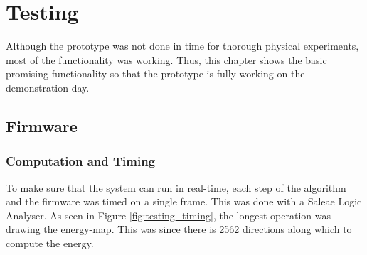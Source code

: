 \documentclass[notitlepage]{report}
\begin{document}
\chapter{Testing}

Although the prototype was not done in time for thorough physical experiments, most of the functionality was working. Thus, this chapter shows the basic promising functionality so that the prototype is fully working on the demonstration-day.

%
%
%

\section{Firmware}

\subsection{Computation and Timing} \label{Computation_and_Timing}

To make sure that the system can run in real-time, each step of the algorithm and the firmware was timed on a single frame. This was done with a Saleae Logic Analyser. As seen in Figure-\ref{fig:testing_timing}, the longest operation was drawing the energy-map. This was since there is 2562 directions along which to compute the energy.
\end{document}
